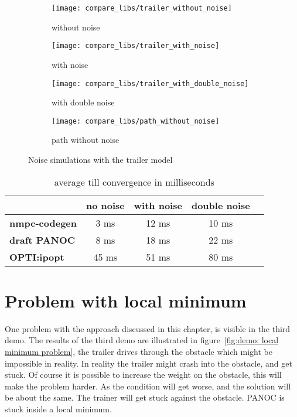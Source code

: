 \begin{figure}[H]
	\centering
	\begin{subfigure}[b]{0.45\textwidth}
		\centering
		\texttt{[image: compare\_libs/trailer\_without\_noise]}
		\caption{without noise}
		\label{fig:timings trailer without noise}
	\end{subfigure}
	\hfill
	\begin{subfigure}[b]{0.45\textwidth}
		\centering
		\texttt{[image: compare\_libs/trailer\_with\_noise]}
		\caption{with noise}
		\label{fig:timings trailer with noise}
	\end{subfigure}
	\begin{subfigure}[b]{0.45\textwidth}
		\centering
		\texttt{[image: compare\_libs/trailer\_with\_double\_noise]}
		\caption{with double noise}
		\label{fig:timings trailer with double noise}
	\end{subfigure}
	\hfill
	\begin{subfigure}[b]{0.45\textwidth}
		\centering
		\texttt{[image: compare\_libs/path\_without\_noise]}
		\caption{path without noise}
		\label{fig:path noise simulations}
	\end{subfigure}
	\caption{Noise simulations with the trailer model}
	\label{fig:Noise simulations with the trailer model}
\end{figure}

\begin{table}[H]
	\centering
	\begin{tabular}{|l|c|c|c|c|}
		\hline
		&\textbf{no noise}&\textbf{with noise}&\textbf{double noise}\\\hline
		\textbf{nmpc-codegen}&3 ms&12 ms&10 ms \\\hline
		\textbf{draft PANOC}&8 ms&18 ms&22 ms \\\hline
		\textbf{OPTI:ipopt}&45 ms&51 ms&80 ms \\\hline
	\end{tabular}
	\caption{average till convergence in milliseconds}
	\label{tbl:average till convergence noise}
\end{table}

\section{Problem with local minimum}
One problem with the approach discussed in this chapter, is visible in the third demo. The results of the third demo are illustrated in figure~\ref{fig:demo: local minimum problem}, the trailer drives through the obstacle which might be impossible in reality. In reality the trailer might crash into the obstacle, and get stuck. Of course it is possible to increase the weight on the obstacle, this will make the problem harder. As the condition will get worse, and the solution will be about the same. The trainer will get stuck against the obstacle. PANOC is stuck inside a local minimum.

